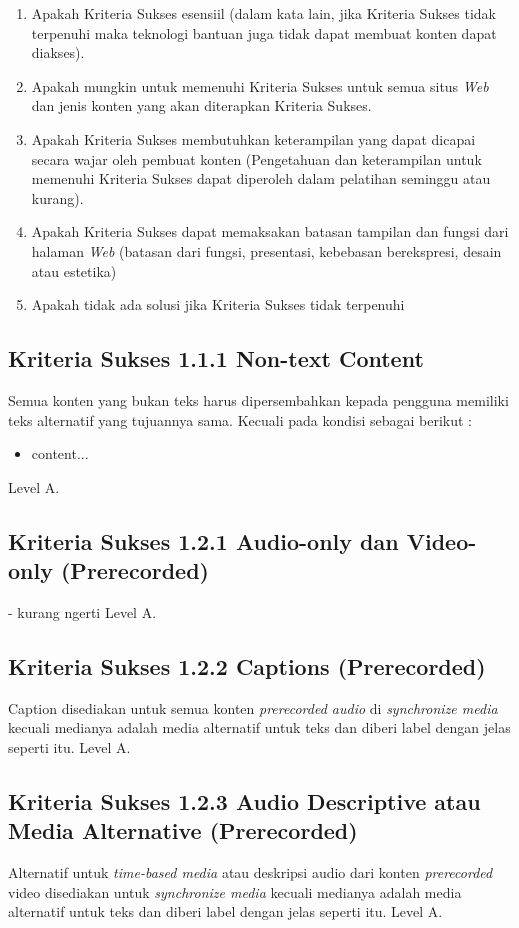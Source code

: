 \begin{enumerate}
	\item Apakah Kriteria Sukses esensiil (dalam kata lain, jika Kriteria Sukses tidak terpenuhi maka teknologi bantuan juga tidak dapat membuat konten dapat diakses).
	\item Apakah mungkin untuk memenuhi Kriteria Sukses untuk semua situs \textit{Web} dan jenis konten yang akan diterapkan Kriteria Sukses.
	\item Apakah Kriteria Sukses membutuhkan keterampilan yang dapat dicapai secara wajar oleh pembuat konten (Pengetahuan dan keterampilan untuk memenuhi Kriteria Sukses dapat diperoleh dalam pelatihan seminggu atau kurang).
	\item Apakah Kriteria Sukses dapat memaksakan batasan tampilan dan fungsi dari halaman \textit{Web} (batasan dari fungsi, presentasi, kebebasan berekspresi, desain atau estetika)
	\item Apakah tidak ada solusi jika Kriteria Sukses tidak terpenuhi
\end{enumerate}

\subsection{Kriteria Sukses 1.1.1 Non-text Content}
\label{sec:kriteria_1.1.1}
Semua konten yang bukan teks harus dipersembahkan kepada pengguna memiliki teks alternatif yang tujuannya sama. Kecuali pada kondisi sebagai berikut :

\begin{itemize}
	\item content...
\end{itemize} 
Level A.

\subsection{Kriteria Sukses 1.2.1 Audio-only dan Video-only (Prerecorded)}
\label{sec:kriteria_1.2.1}
- kurang ngerti
Level A.

\subsection{Kriteria Sukses 1.2.2 Captions (Prerecorded)}
\label{sec:kriteria_1.2.2}
Caption disediakan untuk semua konten \textit{prerecorded audio} di \textit{synchronize media} kecuali medianya adalah media alternatif untuk teks dan diberi label dengan jelas seperti itu.
Level A.

\subsection{Kriteria Sukses 1.2.3 Audio Descriptive atau Media Alternative (Prerecorded)}
\label{sec:kriteria_1.2.3}
Alternatif untuk \textit{time-based media} atau deskripsi audio dari konten \textit{prerecorded} video disediakan untuk \textit{synchronize media} kecuali medianya adalah media alternatif untuk teks dan diberi label dengan jelas seperti itu.
Level A.


